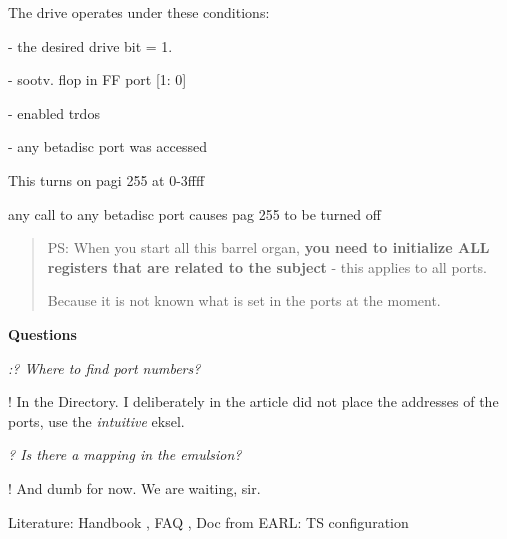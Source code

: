 \documentclass{article}
\begin{document}
The drive operates under these conditions:

- the desired drive bit = 1.

- sootv. flop in FF port [1: 0]

- enabled trdos

- any betadisc port was accessed

This turns on pagi 255 at 0-3ffff

any call to any betadisc port causes pag 255 to be turned off

\begin{quotation}
  PS: When you start all this barrel organ, \textbf{you need to
    initialize ALL registers that are related to the subject} - this
  applies to all ports.

  Because it is not known what is set in the ports at the moment.
\end{quotation}

\textbf{Questions }

\emph{:? Where to find port numbers? }

! In the Directory. I deliberately in the article did not place the
addresses of the ports, use the \emph{intuitive} eksel.

\emph{? Is there a mapping in the emulsion? }

! And dumb for now. We are waiting, sir.

Literature: Handbook , FAQ , Doc from EARL: TS configuration
\end{document}
